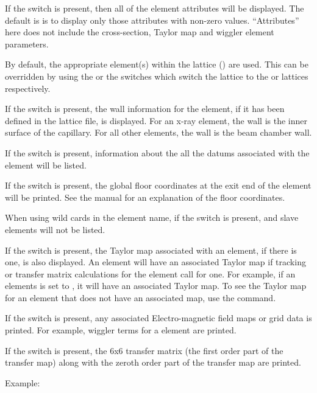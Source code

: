 {{{\begin{description}
If the  switch is present, then all of the element attributes
will be displayed. The default is is to display only those attributes
with non-zero values. ``Attributes'' here does not include the cross-section,
Taylor map and wiggler element parameters.

By default, the appropriate element(s) within the  lattice
() are used. This can be overridden by using the
 or the  switches which switch the lattice to
the  or  lattices respectively.

If the  switch is present, the wall information for the
element, if it has been defined in the lattice file, is displayed. For
an x-ray  element, the wall is the inner surface of the
capillary. For all other elements, the wall is the beam chamber wall.

If the  switch is present, information about the 
all the datums associated with the element will be listed. 

If the  switch is present, the global
floor coordinates at the exit end of the element will
be printed. See the \bmad manual for an explanation
of the floor coordinates.

When using wild cards in the element name, if the 
switch is present,  and  slave elements
will not be listed.

If the  switch is present, the Taylor map associated with
an element, if there is one, is also displayed. An element will have
an associated Taylor map if tracking or transfer matrix calculations
for the element call for one. For example, if an elements
 is set to , it will have an associated
Taylor map. To see the Taylor map for an element that does not have an
associated map, use the  command.

If the  switch is present, any associated 
Electro-magnetic field maps or grid data is printed. For example, 
wiggler terms for a   element are printed.

If the  switch is present, the 6x6 transfer matrix (the
first order part of the transfer map) along with the zeroth order part
of the transfer map are printed.

Example:


\end{description}}}}
